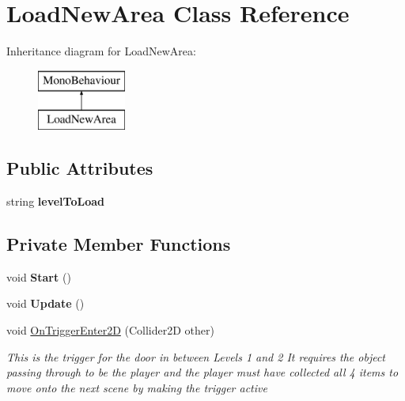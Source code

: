 \hypertarget{class_load_new_area}{}\section{Load\+New\+Area Class Reference}
\label{class_load_new_area}
Inheritance diagram for Load\+New\+Area\+:\begin{figure}[H]
\begin{center}
\leavevmode
\includegraphics[height=2.000000cm]{class_load_new_area}
\end{center}
\end{figure}
\subsection*{Public Attributes}
\begin{DoxyCompactItemize}
\item 
\mbox{\label{class_load_new_area_a1d4194f749b6ca5c9412d1185bb295e9}} 
string {\bfseries level\+To\+Load}
\end{DoxyCompactItemize}
\subsection*{Private Member Functions}
\begin{DoxyCompactItemize}
\item 
\mbox{\label{class_load_new_area_a2b5dd2fba10d61b23c375028b18eac22}} 
void {\bfseries Start} ()
\item 
\mbox{\label{class_load_new_area_ae44863b1d524c2edab0732fefb815f06}} 
void {\bfseries Update} ()
\item 
void \mbox{\hyperlink{class_load_new_area_abdcf65c2a5ab9925bbd336e774baa82e}{On\+Trigger\+Enter2D}} (Collider2D other)
\begin{DoxyCompactList}\small\item\em This is the trigger for the door in between Levels 1 and 2 It requires the object passing through to be the player and the player must have collected all 4 items to move onto the next scene by making the trigger active \end{DoxyCompactList}\end{DoxyCompactItemize}


